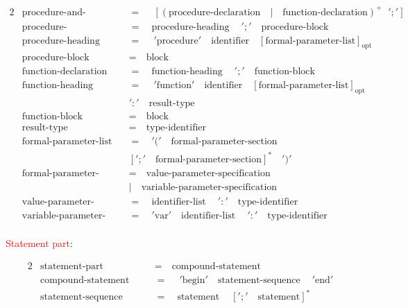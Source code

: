 \documentclass{article}
\begin{document}
\begin{alignat*}{2}
&\text{procedure-and-function-declaration-part}\quad&&=\quad\ {[(\text{procedure-declaration}\quad|\quad\text{function-declaration})\quad\ ';']}^+\\
&\text{procedure-declaration}\quad&&=\quad\text{procedure-heading}\quad\ ';'\quad\text{procedure-block}\\
&\text{procedure-heading}\quad&&=\quad\ '\text{procedure}'\quad\text{identifier}\quad{[\text{formal-parameter-list}]}_\text{opt}\\
&\text{procedure-block}\quad&&=\quad\text{block}\\
&\text{function-declaration}\quad&&=\quad\text{function-heading}\quad\ ';'\quad\text{function-block}\\
&\text{function-heading}\quad&&=\quad\ '\text{function}'\quad\text{identifier}\quad{[\text{formal-parameter-list}]}_\text{opt}\quad\\
&&&':'\quad \text{result-type}\\
&\text{function-block}\quad&&=\quad\text{block}\\
&\text{result-type}\quad&&=\quad\text{type-identifier}\\
&\text{formal-parameter-list}\quad&&=\quad'('\quad\text{formal-parameter-section}\\
&&&{[';' \quad\text{formal-parameter-section}]}^*\quad')'\\
&\text{formal-parameter-section}\quad&&=\quad\text{value-parameter-specification}\\
&&&|\quad\text{variable-parameter-specification}\\
&\text{value-parameter-specification}\quad&&=\quad\text{identifier-list}\quad\ ':'\quad\text{type-identifier}\\
&\text{variable-parameter-specification}\quad&&=\quad'\text{var}'\quad\text{identifier-list}\quad\ ':'\quad\text{type-identifier}\\
\end{alignat*}

\textcolor{red}{Statement part}:

\begin{alignat*}{2}
&\text{statement-part}\quad&&=\quad\text{compound-statement}\\
&\text{compound-statement}\quad&&=\quad\ '\text{begin}' \quad\text{statement-sequence}\quad\ '\text{end}'\\
&\text{statement-sequence}\quad&&=\quad\text{statement}\quad\ {[';'\quad\text{statement}]^*}\\
\end{alignat*}
\end{document}
